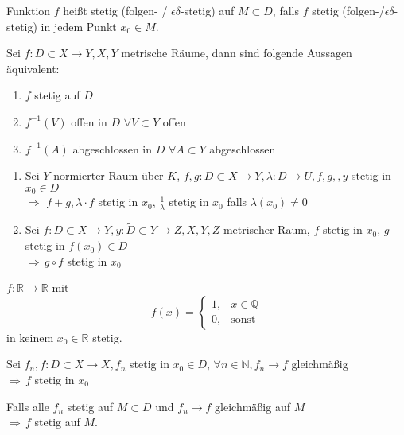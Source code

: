 \begin{definition}
	Funktion $f$ heißt stetig (folgen- / $\epsilon\delta$-stetig) auf $M\subset D$, falls $f$ stetig (folgen-/$\epsilon\delta$-stetig) in jedem Punkt $x_0\in M$.
\end{definition}
\begin{proposition}
	Sei $f:D\subset X\to Y, X,Y$ metrische Räume, dann sind folgende Aussagen äquivalent:
	\begin{enumerate}[label={\arabic*)}]
		\item $f$ stetig auf $D$
		\item $f^{-1}(V)$ offen in $D$ $\forall V\subset Y$ offen
		\item $f^{-1}(A)$ abgeschlossen in $D$ $\forall A\subset Y$ abgeschlossen
	\end{enumerate}
\end{proposition}
\begin{proposition}[Rechenregeln]
	\begin{enumerate}[label={\arabic*)}]
		\item Sei $Y$ normierter Raum über $K$, $f,g:D\subset X\to Y, \lambda: D\to U, f,g, ,y $ stetig in $x_0\in D$\\
		$\Rightarrow$ $f+g, \lambda\cdot f$ stetig in $x_0$, $\frac{1}{\lambda}$ stetig in $x_0$ falls $\lambda(x_0) \neq 0$
		\item Sei $f:D\subset X\to Y, y:\tilde{D}\subset Y\to Z, X, Y, Z$ metrischer Raum, $f$ stetig in $x_0$, $g$ stetig in $f(x_0)\in \tilde{D}$\\
		$\Rightarrow \,g\circ f$ stetig in $x_0$ 
	\end{enumerate}
\end{proposition}
\addtocounter{theorem}{3}
\begin{example}
	$f:\mathbb{R}\to \mathbb{R}$ mit \[f(x) = \begin{cases}
	 1,&x\in\mathbb{Q}\\ 0,&\text{sonst}
	\end{cases} \] in keinem $x_0\in\mathbb{R}$ stetig.
\end{example}
\begin{proposition}
	Sei $f_n, f:D\subset X\to X, f_n$ stetig in $x_0\in D$, $\forall n\in\mathbb{N}, f_n\to f$ gleichmäßig\\
	$\Rightarrow \, f$ stetig in $x_0$
\end{proposition}

\begin{conclusion}
	Falls alle $f_n$ stetig auf $M\subset D$ und $f_n\to f$ gleichmäßig auf $M$ \\
	$\Rightarrow\, f$ stetig auf $M$.
\end{conclusion}

